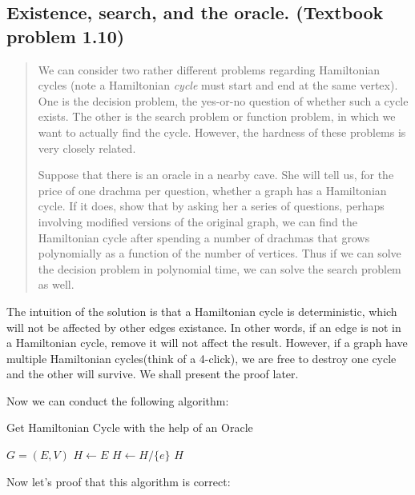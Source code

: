 \subsection*{Existence, search, and the oracle. (Textbook problem 1.10)}
    \begin{quote}
    We can consider two rather different problems regarding Hamiltonian cycles (note a Hamiltonian \emph{cycle} must start and end at the same vertex). One is the decision problem, the yes-or-no question of whether such a cycle exists. The other is the search problem or function problem, in which we want to actually find the cycle. However, the hardness of these problems is very closely related.

    Suppose that there is an oracle in a nearby cave. She will tell us, for the price of one drachma per question, whether a graph has a Hamiltonian cycle. If it does, show that by asking her a series of questions, perhaps involving modified versions of the original graph, we can find the Hamiltonian cycle after spending a number of drachmas that grows polynomially as a function of the number of vertices. Thus if we can solve the decision problem in polynomial time, we can solve the search problem as well.
    \end{quote}

\solution

The intuition of the solution is that a Hamiltonian cycle is deterministic, which will not be affected by other edges existance.
In other words, if an edge is not in a Hamiltonian cycle, remove it will not affect the result.
However, if a graph have multiple Hamiltonian cycles(think of a 4-click), we are free to destroy one cycle and the other will survive. 
We shall present the proof later.

Now we can conduct the following algorithm:

\begin{algorithm}
\caption{Get Hamiltonian Cycle with the help of an Oracle}
\begin{algorithmic}
	\REQUIRE $G = (E, V)$
	\STATE $H \leftarrow E$
			\STATE $H \leftarrow H / \{e\}$
		\ENDIF
	\ENDFOR
	\RETURN $H$
\end{algorithmic}
\end{algorithm}

Now let's proof that this algorithm is correct:

